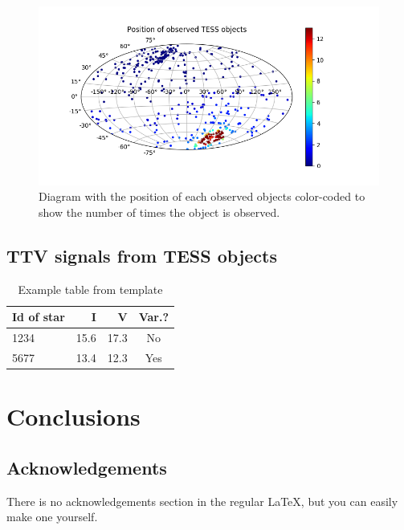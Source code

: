 \documentclass[12pt]{report}
\newcommand{\mnras}{MNRAS}
\newcommand{\aap}{A\&A}
\begin{document}
	\begin{figure}
		\centering
		\includegraphics[width=12cm]{img/skymap_TESS_wrap.png}
	  	\caption{Diagram with the position of each observed objects color-coded to show the number of times the object is observed.}		\end{figure}

\section{TTV signals from TESS objects}


\begin{table}[!h]
\caption{Example table from template}\smallskip
\label{table:1}
\centering  
\begin{tabular}{lrrc}
\hline\hline  
\smallskip
Id of star & I &  V & Var.? \\
\hline
1234 & 15.6 & 17.3 & No \\
5677 & 13.4 & 12.3 & Yes\\
\hline
\end{tabular}
\end{table}

   

\chapter{Conclusions}


\section*{Acknowledgements}

There is no acknowledgements section in the regular LaTeX, but you can easily
make one yourself.

%
\end{document}
